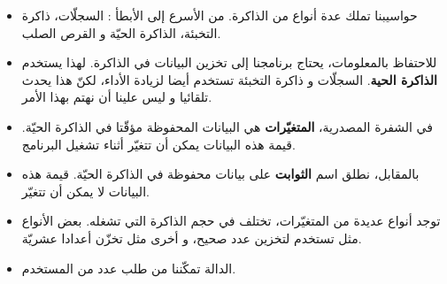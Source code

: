 \begin{itemize}
  \item حواسيبنا تملك عدة أنواع من الذاكرة. من الأسرع إلى الأبطأ : السجلّات، ذاكرة التخبئة، الذاكرة الحيّة و القرص الصلب.
  \item للاحتفاظ بالمعلومات، يحتاج برنامجنا إلى تخزين البيانات في الذاكرة. لهذا يستخدم
\textbf{الذاكرة الحية}.
السجلّات و ذاكرة التخبئة تستخدم أيضا لزيادة الأداء، لكنّ هذا يحدث تلقائيا و ليس علينا أن نهتم بهذا الأمر.
  \item في الشفرة المصدرية،
\textbf{المتغيّرات}
هي البيانات المحفوظة مؤقّتا في الذاكرة الحيّة. قيمة هذه البيانات يمكن أن تتغيّر أثناء تشغيل البرنامج.
  \item بالمقابل، نطلق اسم
\textbf{الثوابت}
على بيانات محفوظة في الذاكرة الحيّة. قيمة هذه البيانات لا يمكن أن تتغيّر.
  \item توجد أنواع عديدة من المتغيّرات، تختلف في حجم الذاكرة التي تشغله. بعض الأنواع مثل
تستخدم لتخزين عدد صحيح، و أخرى مثل
تخزّن أعدادا عشريّة.
  \item الدالة
 تمكّننا من طلب عدد من المستخدم.
\end{itemize}
